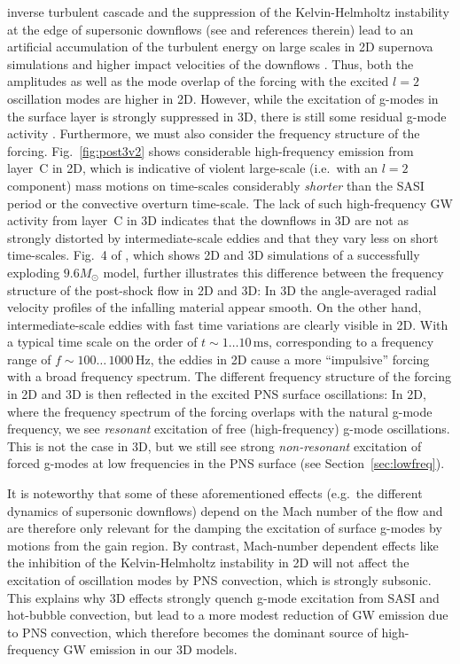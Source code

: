 inverse turbulent cascade \citep{kraichnan_76} and the suppression of
the Kelvin-Helmholtz instability at the edge of supersonic downflows
(see \citealt{mueller_15b} and references therein) lead to an
artificial accumulation of the turbulent energy on large scales in 2D
supernova simulations \citep{hanke_12,abdikamalov_15} and higher
impact velocities of the downflows
\citep{melson_15a,mueller_15b}.  Thus, both the amplitudes as well as
the mode overlap of the forcing with the excited $l=2$ oscillation
modes are higher in 2D.  However, while the
excitation of g-modes in the surface layer is strongly suppressed in
3D, there is still some residual g-mode activity
\citep{melson_15a,mueller_15b}.  {Furthermore,} we must also
consider the frequency structure of the forcing.
Fig.~\ref{fig:post3v2} shows considerable high-frequency emission from
layer~C in 2D, which is indicative of violent large-scale (i.e.\ with
an $l=2$ component) mass motions on time-scales considerably
\emph{shorter} than the SASI period or the convective overturn
time-scale. The lack of such high-frequency GW activity from layer~C
in 3D indicates that the downflows in 3D are not as strongly distorted
by intermediate-scale eddies and that they vary less on short
time-scales.  Fig.~4 of \citet{melson_15a}, which shows 2D and 3D
simulations of a successfully exploding $9.6 M_\odot$ model, further
illustrates this difference between the frequency structure of the
post-shock flow in 2D and 3D: In 3D the angle-averaged radial velocity
profiles of the infalling material appear smooth. On the other hand,
intermediate-scale eddies with fast time variations are clearly
visible in 2D.  With a typical time scale on the order of $t \sim
1\ldots 10 \, \mathrm{ms}$, corresponding to a frequency range of $f
\sim 100 \ldots \,1000 \, \mathrm{Hz}$, the eddies in 2D cause a more
``impulsive'' forcing with a broad frequency spectrum.  The different
frequency structure of the forcing in 2D and 3D is then reflected in
the excited PNS surface oscillations: In 2D, where the frequency
spectrum of the forcing overlaps with the natural g-mode frequency, we
see \emph{resonant} excitation of free (high-frequency) g-mode
oscillations.  This is not the case in 3D, but we still see strong
\emph{non-resonant} excitation of forced g-modes at low frequencies in
the PNS surface (see Section~\ref{sec:lowfreq}). 

{It is noteworthy that some of these aforementioned effects
(e.g.\ the different dynamics of supersonic downflows) depend on the Mach number
of the flow and are therefore
only relevant for the damping the excitation of surface g-modes by motions from
the gain region. By contrast, Mach-number dependent effects
like the inhibition of the Kelvin-Helmholtz instability in 2D
will not affect the excitation of oscillation modes by PNS convection,
which is strongly subsonic. This explains why 3D effects
strongly quench g-mode excitation from SASI and
hot-bubble convection, but lead to a more
modest reduction of GW emission due to PNS convection, which
therefore becomes the dominant source of high-frequency GW emission in
our 3D models.
}

